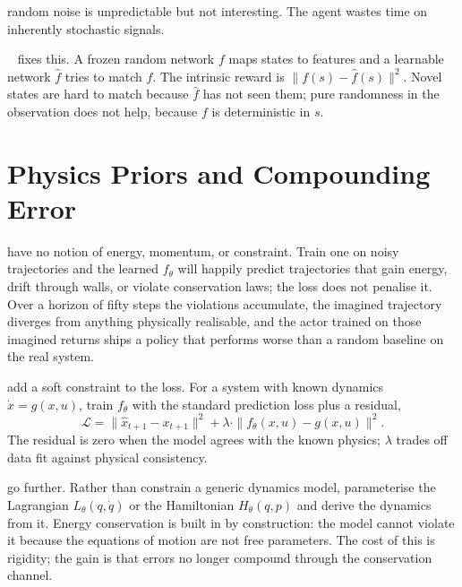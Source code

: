  random noise is unpredictable but not interesting. The agent wastes time on inherently stochastic signals.

~\cite{Burda2019RND} fixes this. A frozen random network $f$ maps states to features and a learnable network $\hat{f}$ tries to match $f$. The intrinsic reward is $\|f(s) - \hat{f}(s)\|^2$. Novel states are hard to match because $\hat{f}$ has not seen them; pure randomness in the observation does not help, because $f$ is deterministic in $s$.


\section{Physics Priors and Compounding Error}


 have no notion of energy, momentum, or constraint. Train one on noisy trajectories and the learned $f_\theta$ will happily predict trajectories that gain energy, drift through walls, or violate conservation laws; the loss does not penalise it. Over a horizon of fifty steps the violations accumulate, the imagined trajectory diverges from anything physically realisable, and the actor trained on those imagined returns ships a policy that performs worse than a random baseline on the real system.

 add a soft constraint to the loss. For a system with known dynamics $\dot{x} = g(x, u)$, train $f_\theta$ with the standard prediction loss plus a residual,
\begin{equation}
    \mathcal{L} = \|\hat{x}_{t+1} - x_{t+1}\|^2 + \lambda \cdot \|f_\theta(x, u) - g(x, u)\|^2.
\end{equation}
The residual is zero when the model agrees with the known physics; $\lambda$ trades off data fit against physical consistency.

 go further. Rather than constrain a generic dynamics model, parameterise the Lagrangian $L_\theta(q, \dot q)$ or the Hamiltonian $H_\theta(q, p)$ and derive the dynamics from it. Energy conservation is built in by construction: the model cannot violate it because the equations of motion are not free parameters. The cost of this is rigidity; the gain is that errors no longer compound through the conservation channel.


